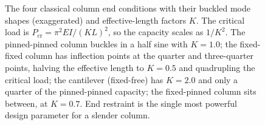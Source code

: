 \begin{figure}[htbp]
\begin{tikzpicture}[scale=1.0]
\end{tikzpicture}
\caption[Column end conditions and effective length]{The four
classical column end conditions with their buckled mode shapes
(exaggerated) and effective-length factors $K$. The critical load is
$P_{\mathrm{cr}}=\pi^2EI/(KL)^2$, so the capacity scales as $1/K^2$.
The pinned-pinned column buckles in a half sine with $K=1.0$; the
fixed-fixed column has inflection points at the quarter and
three-quarter points, halving the effective length to $K=0.5$ and
quadrupling the critical load; the cantilever (fixed-free) has
$K=2.0$ and only a quarter of the pinned-pinned capacity; the
fixed-pinned column sits between, at $K=0.7$. End restraint is the
single most powerful design parameter for a slender column.}
\label{fig:vol03ch08:column-end-conditions}
\end{figure}
